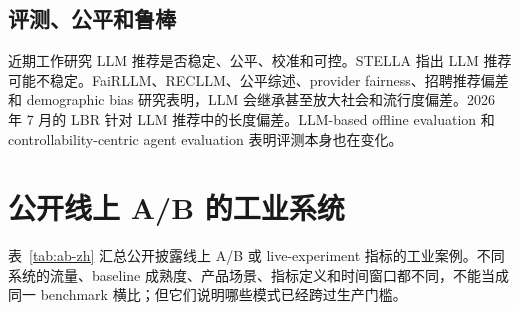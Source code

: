 \documentclass[UTF8,fontset=fandol,11pt]{ctexart}
\begin{document}
\subsection{评测、公平和鲁棒}

近期工作研究 LLM 推荐是否稳定、公平、校准和可控。STELLA 指出 LLM 推荐可能不稳定。FaiRLLM、RECLLM、公平综述、provider fairness、招聘推荐偏差和 demographic bias 研究表明，LLM 会继承甚至放大社会和流行度偏差。2026 年 7 月的 LBR 针对 LLM 推荐中的长度偏差。LLM-based offline evaluation 和 controllability-centric agent evaluation 表明评测本身也在变化。

\section{公开线上 A/B 的工业系统}

表~\ref{tab:ab-zh} 汇总公开披露线上 A/B 或 live-experiment 指标的工业案例。不同系统的流量、baseline 成熟度、产品场景、指标定义和时间窗口都不同，不能当成同一 benchmark 横比；但它们说明哪些模式已经跨过生产门槛。
\end{document}
